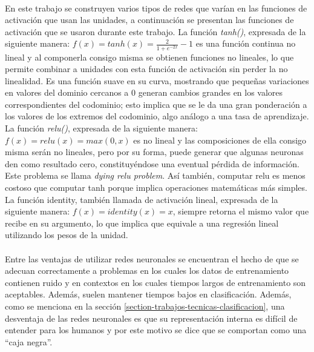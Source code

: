 \paragraph{}En este trabajo se construyen varios tipos de redes que varían en las funciones de activación que usan las unidades, a continuación se presentan las funciones de activación que se usaron durante este trabajo. La función \textit{tanh()}, expresada de la siguiente manera: $f(x) = tanh(x) = \frac{2}{1 + e^{-2x}} - 1 $ es una función continua no lineal y al componerla consigo misma se obtienen funciones no lineales, lo que permite combinar a unidades con esta función de activación sin perder la no linealidad. Es una función suave en su curva, mostrando que pequeñas variaciones en valores del dominio cercanos a 0 generan cambios grandes en los valores correspondientes del codominio; esto implica que se le da una gran ponderación a los valores de los extremos del codominio, algo análogo a una tasa de aprendizaje. La función \textit{relu()}, expresada de la siguiente manera: $f(x) = relu(x) = max(0, x)$ es no lineal y las composiciones de ella consigo misma serán no lineales, pero por su forma, puede generar que algunas neuronas den como resultado cero, constituyéndose una eventual pérdida de información. Este problema se llama \textit{dying relu problem}. Así también, computar relu es menos costoso que computar tanh porque implica operaciones matemáticas más simples. La función identity, también llamada de activación lineal, expresada de la siguiente manera: $f(x) = identity(x) = x$, siempre retorna el mismo valor que recibe en su argumento, lo que implica que equivale a una regresión lineal utilizando los pesos de la unidad.

\paragraph{}Entre las ventajas de utilizar redes neuronales se encuentran el hecho de que se adecuan correctamente a problemas en los cuales los datos de entrenamiento contienen ruido y en contextos en los cuales tiempos largos de entrenamiento son aceptables. Además, suelen mantener tiempos bajos en clasificación.
Además, como se menciona en la sección \ref{section-trabajos-tecnicas-clasificacion}, una desventaja de las redes neuronales es que su representación interna es difícil de entender para los humanos y por este motivo se dice que se comportan como una “caja negra”.